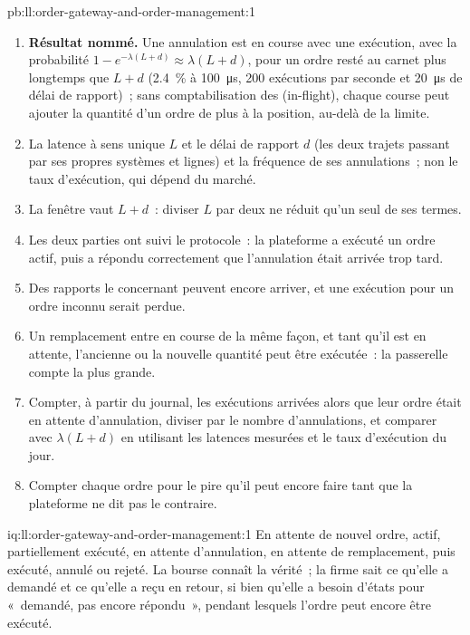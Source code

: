 \begin{solution}{pb:ll:order-gateway-and-order-management:1}
\begin{enumerate}
\item \textbf{Résultat nommé.} Une annulation est en course avec une exécution, avec la probabilité $1 - e^{-\lambda (L + d)} \approx \lambda (L + d)$, pour un
ordre resté au carnet plus longtemps que $L + d$ (2.4~\% à \qty{100}{\micro\second}, 200 exécutions par seconde et \qty{20}{\micro\second} de
délai de rapport)~; sans comptabilisation des  (in-flight), chaque course peut ajouter la quantité d'un ordre de plus à la position, au-delà de la limite.
\item La latence à sens unique $L$ et le délai de rapport $d$ (les deux trajets passant par ses propres systèmes et lignes) et la fréquence de ses annulations~;
non le taux d'exécution, qui dépend du marché.
\item La fenêtre vaut $L + d$~: diviser $L$ par deux ne réduit qu'un seul de ses termes.
\item Les deux parties ont suivi le protocole~: la plateforme a exécuté un ordre actif, puis a répondu correctement que l'annulation était arrivée trop
tard.
\item Des rapports le concernant peuvent encore arriver, et une exécution pour un ordre inconnu serait perdue.
\item Un remplacement entre en course de la même façon, et tant qu'il est en attente, l'ancienne ou la nouvelle quantité peut être exécutée~: la passerelle compte
la plus grande.
\item Compter, à partir du journal, les exécutions arrivées alors que leur ordre était en attente d'annulation, diviser par le nombre d'annulations, et comparer
avec $\lambda (L + d)$ en utilisant les latences mesurées et le taux d'exécution du jour.
\item Compter chaque ordre pour le pire qu'il peut encore faire tant que la plateforme ne dit pas le contraire.
\end{enumerate}
\end{solution}

\begin{solution}{iq:ll:order-gateway-and-order-management:1}
En attente de nouvel ordre, actif, partiellement exécuté, en attente d'annulation, en attente de remplacement, puis exécuté, annulé ou rejeté. La bourse connaît la
vérité~; la firme sait ce qu'elle a demandé et ce qu'elle a reçu en retour, si bien qu'elle a besoin d'états pour «~demandé, pas encore répondu~», pendant lesquels
l'ordre peut encore être exécuté.
\end{solution}

